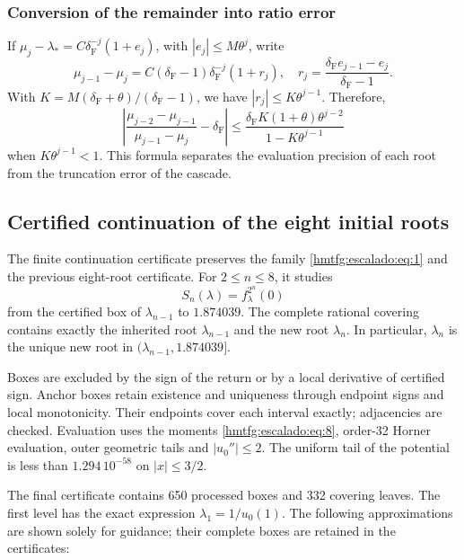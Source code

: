 \subsubsection{Conversion of the remainder into ratio error}

If \(\mu_j-\lambda_*=C\delta_{\mathrm F}^{-j}(1+e_j)\), with \(|e_j|\le M\theta^j\), write
\[
\mu_{j-1}-\mu_j=C(\delta_{\mathrm F}-1)\delta_{\mathrm F}^{-j}(1+r_j),
\quad
r_j=\frac{\delta_{\mathrm F} e_{j-1}-e_j}{\delta_{\mathrm F}-1}.
\]
With \(K=M(\delta_{\mathrm F}+\theta)/(\delta_{\mathrm F}-1)\), we have \(|r_j|\le K\theta^{j-1}\). Therefore,
\begin{equation}
\boxed{
\left|\frac{\mu_{j-2}-\mu_{j-1}}{\mu_{j-1}-\mu_j}-\delta_{\mathrm F}\right|
\le\frac{\delta_{\mathrm F} K(1+\theta)\theta^{j-2}}
{1-K\theta^{j-1}}}
\label{hmtfg:escalado:eq:25}
\end{equation}
when \(K\theta^{j-1}<1\). This formula separates the evaluation precision of each root from the truncation error of the cascade.


\subsection{Certified continuation of the eight initial roots}
\label{hmtfg:escalado:9}

The finite continuation certificate preserves the family \eqref{hmtfg:escalado:eq:1} and the previous eight-root certificate. For \(2\le n\le8\), it studies
\[
S_n(\lambda)=f_\lambda^{2^n}(0)
\]
from the certified box of \(\lambda_{n-1}\) to \(1.874039\). The complete rational covering contains exactly the inherited root \(\lambda_{n-1}\) and the new root \(\lambda_n\). In particular, \(\lambda_n\) is the unique new root in \((\lambda_{n-1},1.874039]\).

Boxes are excluded by the sign of the return or by a local derivative of certified sign. Anchor boxes retain existence and uniqueness through endpoint signs and local monotonicity. Their endpoints cover each interval exactly; adjacencies are checked. Evaluation uses the moments \eqref{hmtfg:escalado:eq:8}, order-32 Horner evaluation, outer geometric tails and \(|u_0''|\le2\). The uniform tail of the potential is less than \(1.294\,10^{-58}\) on \(|x|\le3/2\).

The final certificate contains 650 processed boxes and 332 covering leaves. The first level has the exact expression \(\lambda_1=1/u_0(1)\). The following approximations are shown solely for guidance; their complete boxes are retained in the certificates:

